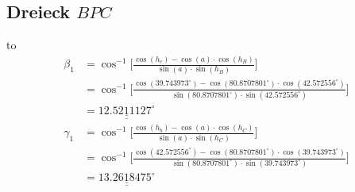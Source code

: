 \subsection{Dreieck $BPC$}
\vspace*{-4mm}
\hbox to
\begin{align*}
\beta_1 &= \cos^{-1}  \bigg[\frac{\cos(h_c)-\cos(a) \cdot \cos(h_B)}{\sin(a) \cdot \sin(h_B)}\bigg] \\
	&= \cos^{-1}  \bigg[\frac{\cos(39.743973^\circ)-\cos(80.8707801^\circ) \cdot \cos(42.572556^\circ)}{\sin(80.8707801^\circ) \cdot \sin(42.572556^\circ)}\bigg] \\
	&=\underline{\underline{12.5211127^\circ}} 
\\
\gamma_1 &= \cos^{-1}  \bigg[\frac{\cos(h_b)-\cos(a) \cdot \cos(h_C)}{\sin(a) \cdot \sin(h_C)}\bigg] \\
	&= \cos^{-1}  \bigg[\frac{\cos(42.572556^\circ)-\cos(80.8707801^\circ) \cdot \cos(39.743973^\circ)}{\sin(80.8707801^\circ) \cdot \sin(39.743973^\circ)}\bigg] \\
	&=\underline{\underline{13.2618475^\circ}} 
\end{align*}

